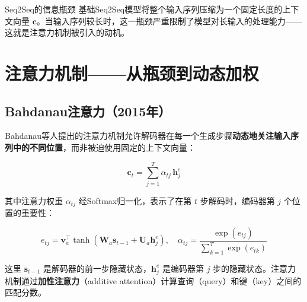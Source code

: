 \begin{myTheorem}{Seq2Seq的信息瓶颈}
基础Seq2Seq模型将整个输入序列压缩为一个固定长度的上下文向量 $\mathbf{c}$。当输入序列较长时，这一瓶颈严重限制了模型对长输入的处理能力——这就是注意力机制被引入的动机。
\end{myTheorem}

\section{注意力机制——从瓶颈到动态加权}

\subsection{Bahdanau注意力（2015年）}

Bahdanau等人提出的注意力机制允许解码器在每一个生成步骤\textbf{动态地关注输入序列中的不同位置}，而非被迫使用固定的上下文向量：

\[
\mathbf{c}_t = \sum_{j=1}^{T} \alpha_{tj}\,\mathbf{h}_j^e
\]

其中注意力权重 $\alpha_{tj}$ 经Softmax归一化，表示了在第 $t$ 步解码时，编码器第 $j$ 个位置的重要性：

\[
e_{tj} = \mathbf{v}_a^{\top}\tanh(\mathbf{W}_a\mathbf{s}_{t-1} + \mathbf{U}_a\mathbf{h}_j^e), \quad
\alpha_{tj} = \frac{\exp(e_{tj})}{\sum_{k=1}^{T}\exp(e_{tk})}
\]

这里 $\mathbf{s}_{t-1}$ 是解码器的前一步隐藏状态，$\mathbf{h}_j^e$ 是编码器第 $j$ 步的隐藏状态。注意力机制通过\textbf{加性注意力}（additive attention）计算查询（query）和键（key）之间的匹配分数。

